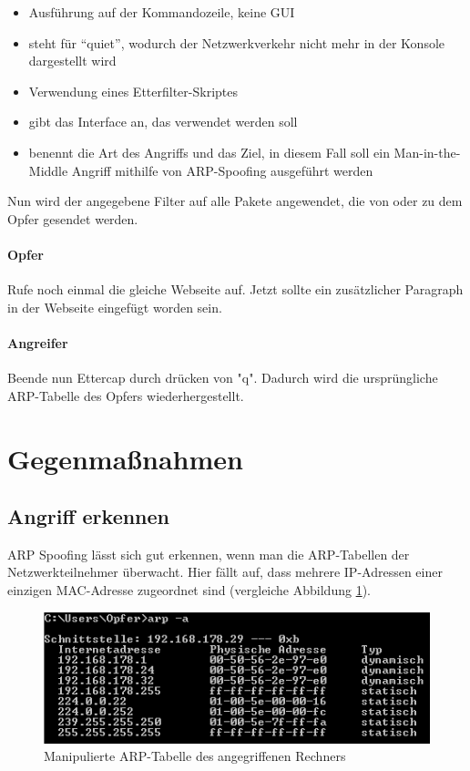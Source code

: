 \begin{itemize}
	\item {} Ausführung auf der Kommandozeile, keine GUI
	\item {} steht für \enquote{quiet}, wodurch der Netzwerkverkehr nicht mehr in der Konsole dargestellt wird
	\item {} Verwendung eines Etterfilter-Skriptes
	\item {} gibt das Interface an, das verwendet werden soll
	\item {} benennt die Art des Angriffs und das Ziel, in diesem Fall soll ein Man-in-the-Middle Angriff mithilfe von ARP-Spoofing ausgeführt werden
\end{itemize}

Nun wird der angegebene Filter auf alle Pakete angewendet, die von oder zu dem Opfer gesendet werden.

\paragraph{Opfer} Rufe noch einmal die gleiche Webseite auf. Jetzt sollte ein zusätzlicher Paragraph in der Webseite eingefügt worden sein.

\paragraph{Angreifer} Beende nun Ettercap durch drücken von "q". Dadurch wird die ursprüngliche ARP-Tabelle des Opfers wiederhergestellt.

\section{Gegenmaßnahmen}

\subsection{Angriff erkennen}
ARP Spoofing lässt sich gut erkennen, wenn man die ARP-Tabellen der Netzwerkteilnehmer überwacht. Hier fällt auf, dass mehrere IP-Adressen einer einzigen MAC-Adresse zugeordnet sind (vergleiche Abbildung \ref{fig:arp_tabelle_nachher}).

\begin{figure}
	\centering
	\includegraphics[width=\textwidth]{images/arp/ARP_Tabelle_Nachher}
	\caption{Manipulierte ARP-Tabelle des angegriffenen Rechners}
	\label{fig:arp_tabelle_nachher}
\end{figure}

